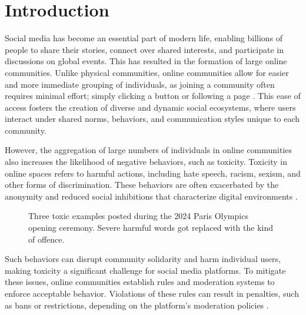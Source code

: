 \chapter{Introduction}\label{introduction}

Social media has become an essential part of modern life, enabling billions of people to share their stories, connect over shared interests, and participate in discussions on global events. This has resulted in the formation of large online communities. Unlike physical communities, online communities allow for easier and more immediate grouping of individuals, as joining a community often requires minimal effort; simply clicking a button or following a page \cite{ellison:2007}. This ease of access fosters the creation of diverse and dynamic social ecosystems, where users interact under shared norms, behaviors, and communication styles unique to each community.

However, the aggregation of large numbers of individuals in online communities also increases the likelihood of negative behaviors, such as toxicity. Toxicity in online spaces refers to harmful actions, including hate speech, racism, sexism, and other forms of discrimination. These behaviors are often exacerbated by the anonymity and reduced social inhibitions that characterize digital environments \cite{suler:2004}.

\begin{figure}[ht]
    \centering
    \caption{Three toxic examples posted during the 2024 Paris Olympics opening ceremony. Severe harmful words got replaced with the kind of offence.}
\end{figure}

Such behaviors can disrupt community solidarity and harm individual users, making toxicity a significant challenge for social media platforms. To mitigate these issues, online communities establish rules and moderation systems to enforce acceptable behavior. Violations of these rules can result in penalties, such as bans or restrictions, depending on the platform's moderation policies \cite{nicholson:2023}.


